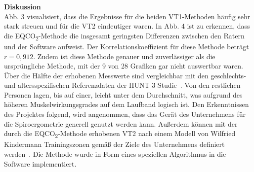 \textbf{\Large Diskussion}\\

Abb. 3 visualisiert, dass die Ergebnisse für die beiden VT1-Methoden häufig sehr stark streuen und für die VT2 eindeutiger waren. In Abb. 4 ist zu erkennen, dass die EQCO\textsubscript{2}-Methode die insgesamt geringsten Differenzen zwischen den Ratern und der Software aufweist. Der Korrelationskoeffizient für diese Methode beträgt $r = 0,912$. Zudem ist diese Methode genauer und zuverlässiger als die ursprüngliche Methode, mit der 9 von 28 Grafiken gar nicht auswertbar waren.\\
Über die Hälfte der erhobenen Messwerte sind vergleichbar mit den geschlechts- und altersspezifischen Referenzdaten der HUNT 3 Studie~\cite{Loe.2014}. Von den restlichen Personen lagen, bis auf einer, leicht unter dem Durchschnitt, was aufgrund des höheren Muskelwirkungsgrades auf dem Laufband logisch ist. Den Erkenntnissen des Projektes folgend, wird angenommen, dass das Gerät des Unternehmens für die Spiroergometrie generell genutzt werden kann. Außerdem können mit der durch die EQCO\textsubscript{2}-Methode erhobenen VT2 nach einem Modell von Wilfried Kindermann Trainingszonen gemäß der Ziele des Unternehmens definiert werden~\cite{Kindermann.2004}. Die Methode wurde in Form eines speziellen Algorithmus in die Software implementiert.
